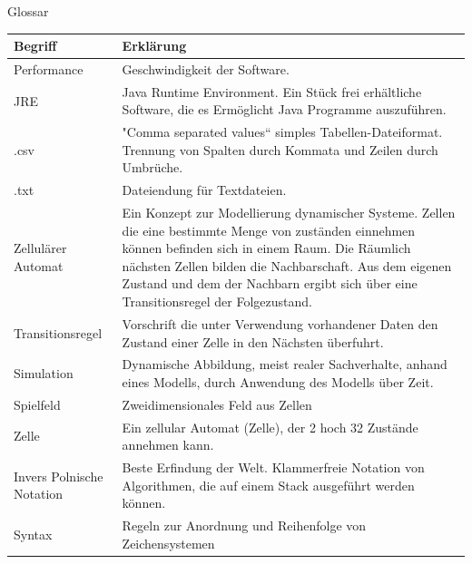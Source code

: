\documentclass[11pt,a4paper]{article}
\begin{document}
\pagebreak


\par
Glossar
\par
\begin{longtable}[m]{|m{8cm}|m{8cm}|}
\hline
Begriff & Erklärung \\
    \hline
  Performance   & Geschwindigkeit der Software. \\
  \hline
JRE  & Java Runtime Environment. Ein Stück frei erhältliche Software, die es Ermöglicht Java Programme auszuführen. \\
    \hline
.csv  & "Comma separated values“ simples Tabellen-Dateiformat. Trennung von Spalten durch Kommata und Zeilen durch Umbrüche. \\
    \hline
.txt  & Dateiendung für Textdateien.\\
    \hline
 Zellulärer Automat & Ein Konzept zur Modellierung dynamischer Systeme.
Zellen die eine bestimmte Menge von zuständen einnehmen können befinden sich in einem Raum. Die Räumlich nächsten Zellen bilden die Nachbarschaft. Aus dem eigenen Zustand und dem der Nachbarn ergibt sich über eine Transitionsregel der Folgezustand.
\\
    \hline
 Transitionsregel & Vorschrift die unter Verwendung vorhandener Daten den Zustand einer Zelle in den Nächsten überfuhrt.\\  
  \hline
 Simulation & Dynamische Abbildung, meist realer Sachverhalte, anhand eines Modells, durch Anwendung des Modells über Zeit.\\
  \hline
  Spielfeld & Zweidimensionales Feld aus Zellen\\
  \hline
  Zelle & Ein zellular Automat (Zelle), der 2 hoch 32 Zustände annehmen kann.\\
  \hline
  Invers Polnische Notation & Beste Erfindung der Welt. Klammerfreie Notation von Algorithmen, die auf einem Stack ausgeführt werden können.\\
  \hline
  Syntax & Regeln zur Anordnung und Reihenfolge von Zeichensystemen\\
  \hline


\end{longtable}
\end{document}
